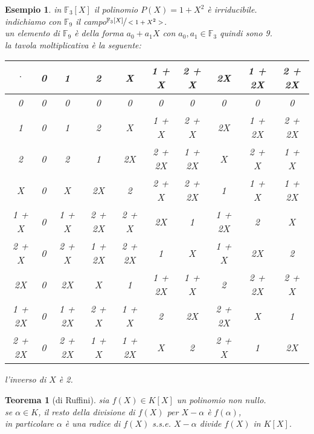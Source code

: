 \documentclass[a4paper,12pt]{article}
\theoremstyle{def}
\theoremstyle{prop}
\theoremstyle{esempio}
\newtheorem*{example}{Esempio}
\theoremstyle{dimostrazione}
\theoremstyle{teo}
\newtheorem*{teorema}{Teorema}
\theoremstyle{osservazione}
\begin{document}
\begin{example}
	in \(\mathbb{F}_3[X]\) il polinomio \(P(X) = 1 + X^2\) è irriducibile.\\
	indichiamo con \(\mathbb{F}_9\) il campo\(\sfrac{\mathbb{F}_3[X]}{<1 + X^2>}\).\\
	un elemento di \(\mathbb{F}_9\) è della forma \(a_0 + a_1X\) con \(a_0,a_1 \in \mathbb{F}_3\) quindi sono 9.\\
	la tavola moltiplicativa è la seguente:
	\begin{center}
		\begin{tabular}{c|ccccccccc}
			\(\cdot\) & 0 & 1      & 2      & X      & 1 + X  & 2 + X  & 2X     & 1 + 2X & 2 + 2X \\
			\hline
			0         & 0 & 0      & 0      & 0      & 0      & 0      & 0      & 0      & 0      \\
			1         & 0 & 1      & 2      & X      & 1 + X  & 2 + X  & 2X     & 1 + 2X & 2 + 2X \\
			2         & 0 & 2      & 1      & 2X     & 2 + 2X & 1 + 2X & X      & 2 + X  & 1 + X  \\
			X         & 0 & X      & 2X     & 2      & 2 + X  & 2 + 2X & 1      & 1 + X  & 1 + 2X \\
			1 + X     & 0 & 1 + X  & 2 + 2X & 2 + X  & 2X     & 1      & 1 + 2X & 2      & X      \\
			2 + X     & 0 & 2 + X  & 1 + 2X & 2 + 2X & 1      & X      & 1 + X  & 2X     & 2      \\
			2X        & 0 & 2X     & X      & 1      & 1 + 2X & 1 + X  & 2      & 2 + 2X & 2 + X  \\
			1 + 2X    & 0 & 1 + 2X & 2 + X  & 1 + X  & 2      & 2X     & 2 + 2X & X      & 1      \\
			2 + 2X    & 0 & 2 + 2X & 1 + X  & 1 + 2X & X      & 2      & 2 + X  & 1      & 2X     \\
		\end{tabular}
	\end{center}
	l'inverso di \(X\) è 2.\\
\end{example}

\begin{teorema}[di Ruffini]
	sia \(f(X) \in K[X]\) un polinomio non nullo.\\
	se \(\alpha \in K\), il resto della divisione di \(f(X)\) per \(X - \alpha\) è \(f(\alpha)\),\\
	in particolare \(\alpha\) è una radice di \(f(X)\) s.s.e. \(X - \alpha\) divide \(f(X)\) in \(K[X]\).\\
\end{teorema}
\end{document}
